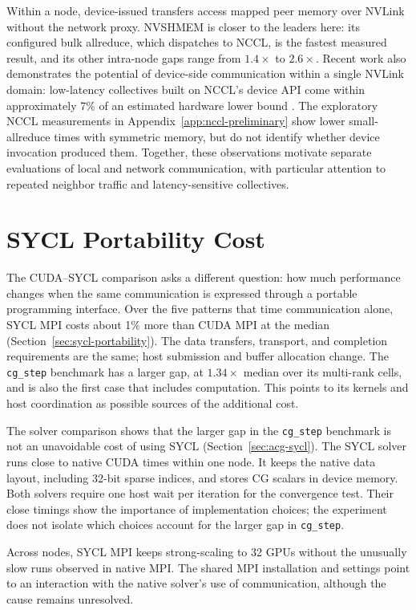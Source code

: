 Within a node, device-issued transfers access mapped peer memory over NVLink without the network proxy. NVSHMEM is closer to the leaders here: its configured bulk allreduce, which dispatches to NCCL, is the fastest measured result, and its other intra-node gaps range from $1.4\times$ to $2.6\times$. Recent work also demonstrates the potential of device-side communication within a single NVLink domain: low-latency collectives built on NCCL's device API come within approximately 7\% of an estimated hardware lower bound \cite{shen_every_2026}. The exploratory NCCL measurements in Appendix~\ref{app:nccl-preliminary} show lower small-allreduce times with symmetric memory, but do not identify whether device invocation produced them. Together, these observations motivate separate evaluations of local and network communication, with particular attention to repeated neighbor traffic and latency-sensitive collectives.

\section{SYCL Portability Cost}\label{sec:sycl-cost}

The CUDA--SYCL comparison asks a different question: how much performance changes when the same communication is expressed through a portable programming interface. Over the five patterns that time communication alone, SYCL MPI costs about 1\% more than CUDA MPI at the median (Section~\ref{sec:sycl-portability}). The data transfers, transport, and completion requirements are the same; host submission and buffer allocation change. The \texttt{cg\_step} benchmark has a larger gap, at $1.34\times$ median over its multi-rank cells, and is also the first case that includes computation. This points to its kernels and host coordination as possible sources of the additional cost.

The solver comparison shows that the larger gap in the \texttt{cg\_step} benchmark is not an unavoidable cost of using SYCL (Section~\ref{sec:acg-sycl}). The SYCL solver runs close to native CUDA times within one node. It keeps the native data layout, including 32-bit sparse indices, and stores CG scalars in device memory. Both solvers require one host wait per iteration for the convergence test. Their close timings show the importance of implementation choices; the experiment does not isolate which choices account for the larger gap in \texttt{cg\_step}.

Across nodes, SYCL MPI keeps strong-scaling to 32 GPUs without the unusually slow runs observed in native MPI. The shared MPI installation and settings point to an interaction with the native solver's use of communication, although the cause remains unresolved.

